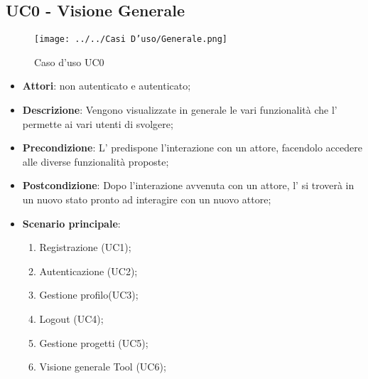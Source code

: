 \subsection{UC0 - Visione Generale}
\label{ssec:UC0}
\begin{figure}[h!]
\centering
\texttt{[image: ../../Casi D'uso/Generale.png]}
\caption{Caso d'uso UC0}
 \end{figure}
\begin{itemize}
\item \textbf{Attori}:  non autenticato e  autenticato;
\item \textbf{Descrizione}: Vengono visualizzate in generale le vari funzionalità che l' permette ai vari utenti di svolgere;
\item \textbf{Precondizione}: L' predispone l'interazione con un attore, facendolo accedere alle diverse funzionalità proposte;
\item \textbf{Postcondizione}: Dopo l'interazione avvenuta con un attore, l' si troverà in un nuovo stato pronto ad interagire con un nuovo attore;
\item \textbf{Scenario principale}: \begin{enumerate}\item Registrazione (UC1);\item Autenticazione (UC2);\item Gestione profilo(UC3);\item Logout (UC4);\item Gestione progetti (UC5);\item Visione generale Tool  (UC6);
 \end{enumerate}
\end{itemize}

